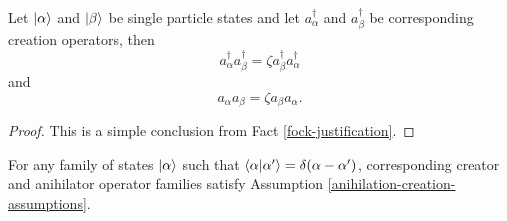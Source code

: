 \documentclass[main.tex]{subfiles}
\begin{document}
\begin{proposition}
Let $\ket{\alpha}$ and $\ket{\beta}$ be single particle states and let $a^\dagger_{\alpha}$ and $a^\dagger_{\beta}$ be corresponding creation operators, then
\begin{equation}
a^\dagger_\alpha a^\dagger_\beta = \zeta  a^\dagger_\beta a^\dagger_\alpha
\end{equation}
and
\begin{equation}
a_\alpha a_\beta = \zeta  a_\beta a_\alpha.
\end{equation}
\end{proposition}
\begin{proof}
This is a simple conclusion from Fact \ref{fock-justification}.
\end{proof}
\begin{corollary}
For any family of states $\ket{\alpha}$ such that $\bra{\alpha}\ket{\alpha'} = \delta(\alpha - \alpha')$, corresponding creator and anihilator operator families satisfy Assumption \ref{anihilation-creation-assumptions}. 
\end{corollary}
\end{document}
